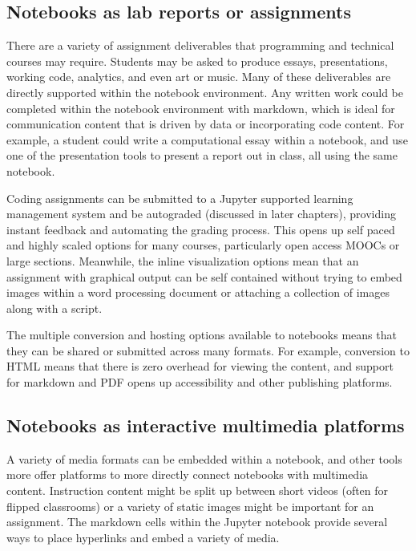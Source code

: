 \documentclass[]{book}
\begin{document}
\subsection{Notebooks as lab reports or
assignments}\label{notebooks-as-lab-reports-or-assignments}

There are a variety of assignment deliverables that programming and
technical courses may require. Students may be asked to produce essays,
presentations, working code, analytics, and even art or music. Many of
these deliverables are directly supported within the notebook
environment. Any written work could be completed within the notebook
environment with markdown, which is ideal for communication content that
is driven by data or incorporating code content. For example, a student
could write a computational essay within a notebook, and use one of the
presentation tools to present a report out in class, all using the same
notebook.

Coding assignments can be submitted to a Jupyter supported learning
management system and be autograded (discussed in later chapters),
providing instant feedback and automating the grading process. This
opens up self paced and highly scaled options for many courses,
particularly open access MOOCs or large sections. Meanwhile, the inline
visualization options mean that an assignment with graphical output can
be self contained without trying to embed images within a word
processing document or attaching a collection of images along with a
script.

The multiple conversion and hosting options available to notebooks means
that they can be shared or submitted across many formats. For example,
conversion to HTML means that there is zero overhead for viewing the
content, and support for markdown and PDF opens up accessibility and
other publishing platforms.

\subsection{Notebooks as interactive multimedia
platforms}\label{notebooks-as-interactive-multimedia-platforms}

A variety of media formats can be embedded within a notebook, and other
tools more offer platforms to more directly connect notebooks with
multimedia content. Instruction content might be split up between short
videos (often for flipped classrooms) or a variety of static images
might be important for an assignment. The markdown cells within the
Jupyter notebook provide several ways to place hyperlinks and embed a
variety of media.
\end{document}
